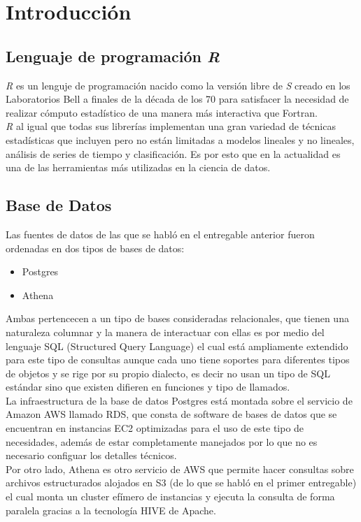 \chapter{Introducción}
\section{Lenguaje de programación \textit{R}}
\textit{R} es un lenguje de programación nacido como la versión libre de \textit{S} creado en los Laboratorios Bell a finales de la década de los 70 para satisfacer la necesidad de realizar cómputo estadístico de una manera más interactiva que Fortran.\cite{S}\\
\textit{R} al igual que todas sus librerías implementan una gran variedad de técnicas estadísticas que incluyen pero no están limitadas a modelos lineales y no lineales, análisis de series de tiempo y clasificación. Es por esto que en la actualidad es una de las herramientas más utilizadas en la ciencia de datos.

\section{Base de Datos}
Las fuentes de datos de las que se habló en el entregable anterior fueron ordenadas en dos tipos de bases de datos:\\
\begin{itemize}
    \item Postgres\cite{PostgreSQL}
    \item Athena\cite{Athena}
\end{itemize}
Ambas pertencecen a un tipo de bases consideradas relacionales, que tienen una naturaleza columnar y la manera de interactuar con ellas es por medio del lenguaje SQL\cite{SQL} (Structured Query Language) el cual está ampliamente extendido para este tipo de consultas aunque cada uno tiene soportes para diferentes tipos de objetos y se rige por su propio dialecto, es decir no usan un tipo de SQL estándar sino que existen difieren en funciones y tipo de llamados.\\
La infraestructura de la base de datos Postgres está montada sobre el servicio de Amazon AWS llamado RDS, que consta de software de bases de datos que se encuentran en instancias EC2 optimizadas para el uso de este tipo de necesidades, además de estar completamente manejados por lo que no es necesario configuar los detalles técnicos.\\
Por otro lado, Athena es otro servicio de AWS que permite hacer consultas sobre archivos estructurados alojados en S3 (de lo que se habló en el primer entregable) el cual monta un cluster efímero de instancias y ejecuta la consulta de forma paralela gracias a la tecnología HIVE de Apache\cite{Apache}.

